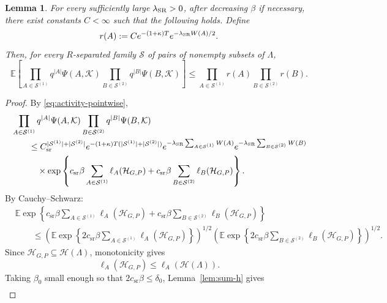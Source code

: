 \documentclass[letterpaper,11pt,reqno]{amsart}
\newtheorem{lemma}[thm]{Lemma}
\theoremstyle{definition}
\begin{document}
\begin{lemma}
\label{lem:weighted-activity}
For every sufficiently large \(\lambda_{\rm SR}>0\), after decreasing \(\beta\) if necessary, there
exist constants \(C<\infty\) such that the following holds.
Define
\[
    r(A)
    :=
    C e^{-(1+\kappa)T}e^{-\lambda_{\rm SR} W(A)/2}.
\]
Then, for every \(R\)-separated family \(\mathcal S\) of pairs of nonempty subsets
of \(\Lambda\),
\[
    \mathbb E\left[
        \prod_{A\in \mathcal{S}^{(1)}}q^{|A|}\Psi (A,\mathcal K)
        \prod_{B\in \mathcal{S}^{(2)}}q^{|B|}\Psi (B,\mathcal K)
    \right]
    \le
    \prod_{A\in\mathcal{S}^{(1)}} r(A)
    \prod_{B\in \mathcal{S}^{(2)}} r(B) .
\]
\end{lemma}
\begin{proof}
By \eqref{eq:activity-pointwise},
\[
\begin{aligned}
&\prod_{A\in \mathcal{S}^{(1)}}q^{|A|}\Psi (A,\mathcal K)
        \prod_{B\in \mathcal{S}^{(2)}}q^{|B|}\Psi (B,\mathcal K)       \\
&\qquad\le
        C_{\mathrm{sr}}^{|\mathcal S^{(1)}|+|\mathcal S^{(2)}|}
        e^{-(1+\kappa)T(|\mathcal S^{(1)}|+|\mathcal S^{(2)}|)}
        e^{-\lambda_{\rm SR}\sum_{A\in\mathcal S^{(1)}}W(A)}
        e^{-\lambda_{\rm SR}\sum_{B\in\mathcal S^{(2)}}W(B)}       \\
&\qquad\quad\times
        \exp\left\{
        c_{\mathrm{sr}}\beta
        \sum_{A\in\mathcal S^{(1)}}\ell_A(\mathcal H_{G,P})
        +
        c_{\mathrm{sr}}\beta
        \sum_{B\in\mathcal S^{(2)}}\ell_B(\mathcal H_{G,P})
        \right\}.
\end{aligned}
\]
By Cauchy--Schwarz:
\[
\begin{aligned}
&\mathbb E
\exp\left\{
c_{\mathrm{sr}}\beta
\sum_{A\in\mathcal S^{(1)}}\ell_A(\mathcal H_{G,P})
+
c_{\mathrm{sr}}\beta
\sum_{B\in\mathcal S^{(2)}}\ell_B(\mathcal H_{G,P})
\right\}                                      \\
&\qquad\le
\left(
\mathbb E
\exp\left\{
2c_{\mathrm{sr}}\beta
\sum_{A\in\mathcal S^{(1)}}\ell_A(\mathcal H_{G,P})
\right\}
\right)^{1/2}
\left(
\mathbb E
\exp\left\{
2c_{\mathrm{sr}}\beta
\sum_{B\in\mathcal S^{(2)}}\ell_B(\mathcal H_{G,P})
\right\}
\right)^{1/2}.
\end{aligned}
\]
Since \(\mathcal H_{G,P}\subseteq \mathcal H(\Lambda)\), monotonicity gives
\[
        \ell_A(\mathcal H_{G,P})\le \ell_A(\mathcal H(\Lambda)).
\]
Taking \(\beta_0\) small enough so that \(2c_{\mathrm{sr}}\beta\le\delta_0\),
Lemma~\ref{lem:sum-h} gives
\[
\begin{aligned}

\end{aligned}\]
\end{proof}
\end{document}
